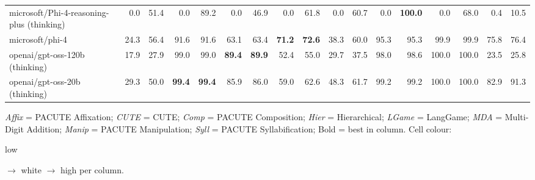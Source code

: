\documentclass{article}
\begin{document}
\begin{table}[htbp]
\begin{threeparttable}
\begin{adjustbox}{max width=\textwidth}
\begin{tabular}{lrrrrrrrrrrrrrrrr}
microsoft/Phi-4-reasoning-plus (thinking) & \cellcolor[HTML]{F4A582}0.0 & \cellcolor[HTML]{E8F2F8}51.4 & \cellcolor[HTML]{F4A582}0.0 & \cellcolor[HTML]{A8D0E4}89.2 & \cellcolor[HTML]{F4A582}0.0 & \cellcolor[HTML]{FBE5DB}46.9 & \cellcolor[HTML]{F4A582}0.0 & \cellcolor[HTML]{B7D8E9}61.8 & \cellcolor[HTML]{F4A582}0.0 & \cellcolor[HTML]{ACD3E6}60.7 & \cellcolor[HTML]{F4A582}0.0 & \cellcolor[HTML]{92C5DE}\textbf{100.0} & \cellcolor[HTML]{F4A582}0.0 & \cellcolor[HTML]{F4A582}68.0 & \cellcolor[HTML]{F4A582}0.4 & \cellcolor[HTML]{F4A582}10.5 \\
microsoft/phi-4 & \cellcolor[HTML]{EEF6F9}24.3 & \cellcolor[HTML]{D6E9F2}56.4 & \cellcolor[HTML]{A3CEE3}91.6 & \cellcolor[HTML]{A3CEE3}91.6 & \cellcolor[HTML]{D2E7F1}63.1 & \cellcolor[HTML]{E8F2F8}63.4 & \cellcolor[HTML]{92C5DE}\textbf{71.2} & \cellcolor[HTML]{92C5DE}\textbf{72.6} & \cellcolor[HTML]{CCE4EF}38.3 & \cellcolor[HTML]{AFD4E6}60.0 & \cellcolor[HTML]{9CCAE1}95.3 & \cellcolor[HTML]{A1CDE2}95.3 & \cellcolor[HTML]{92C5DE}99.9 & \cellcolor[HTML]{92C5DE}99.9 & \cellcolor[HTML]{B9DAE9}75.8 & \cellcolor[HTML]{BDDCEB}76.4 \\
openai/gpt-oss-120b (thinking) & \cellcolor[HTML]{FDF1EB}17.9 & \cellcolor[HTML]{F8CCB9}27.9 & \cellcolor[HTML]{92C5DE}99.0 & \cellcolor[HTML]{92C5DE}99.0 & \cellcolor[HTML]{92C5DE}\textbf{89.4} & \cellcolor[HTML]{92C5DE}\textbf{89.9} & \cellcolor[HTML]{CBE3EF}52.4 & \cellcolor[HTML]{CEE5F0}55.0 & \cellcolor[HTML]{F0F7FA}29.7 & \cellcolor[HTML]{FCE7DD}37.5 & \cellcolor[HTML]{96C7DF}98.0 & \cellcolor[HTML]{96C7DF}98.6 & \cellcolor[HTML]{92C5DE}100.0 & \cellcolor[HTML]{92C5DE}100.0 & \cellcolor[HTML]{F9D2C0}23.5 & \cellcolor[HTML]{F8C6B0}25.8 \\
openai/gpt-oss-20b (thinking) & \cellcolor[HTML]{D4E8F2}29.3 & \cellcolor[HTML]{EDF5F9}50.0 & \cellcolor[HTML]{92C5DE}\textbf{99.4} & \cellcolor[HTML]{92C5DE}\textbf{99.4} & \cellcolor[HTML]{9AC9E0}85.9 & \cellcolor[HTML]{9ECBE1}86.0 & \cellcolor[HTML]{B7D8E9}59.0 & \cellcolor[HTML]{B4D7E8}62.6 & \cellcolor[HTML]{A2CDE3}48.3 & \cellcolor[HTML]{A7D0E4}61.7 & \cellcolor[HTML]{93C5DE}99.2 & \cellcolor[HTML]{94C6DE}99.2 & \cellcolor[HTML]{92C5DE}100.0 & \cellcolor[HTML]{92C5DE}100.0 & \cellcolor[HTML]{A8D1E4}82.9 & \cellcolor[HTML]{96C7DF}91.3 \\
\bottomrule
\end{tabular}
\end{adjustbox}
\begin{tablenotes}[flushleft]\footnotesize
\item \textit{Affix} = PACUTE Affixation; \textit{CUTE} = CUTE; \textit{Comp} = PACUTE Composition; \textit{Hier} = Hierarchical; \textit{LGame} = LangGame; \textit{MDA} = Multi-Digit Addition; \textit{Manip} = PACUTE Manipulation; \textit{Syll} = PACUTE Syllabification; Bold = best in column. Cell colour: \colorbox[HTML]{F4A582}{\strut low} $\to$ white $\to$ \colorbox[HTML]{92C5DE}{high} per column.
\end{tablenotes}
\end{threeparttable}
\end{table}
\end{document}
